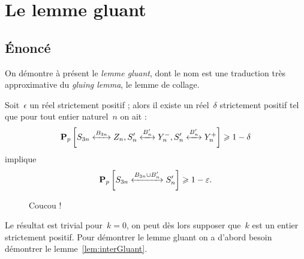 \section{Le lemme gluant}
	\subsection{Énoncé}
		On démontre à présent le \emph{lemme gluant}, dont le nom est une traduction très approximative du \emph{gluing lemma}, le lemme de collage.
			
		\begin{lem}\label{lem:gluant}
			Soit~$\epsilon$ un réel strictement positif ; alors il existe un réel~$\delta$ strictement positif tel que pour tout entier naturel~$n$ on ait :
			\[
				\Pp{\relie[B_{3n}]{S_{3n}}{Z_n},
					\relie[B_n']{S_n'}{Y_n^-},
					\relie[B_n']{S_n'}{Y_n^+}}
				\geq 1 - \delta
			\]
			implique
			\[
				\Pp{\relie[B_{3n}\cup B_n']{S_{3n}}{S_n'}}
				\geq 1 - \epsilon.
			\]
		\end{lem}
			\begin{figure}[h]
			\begin{center}
			\begin{quartCarre}
			\end{quartCarre}
			\end{center}
			\caption{Coucou !}
		\end{figure}
		Le résultat est trivial pour~$k=0$, on peut dès lors supposer que~$k$ est un entier strictement positif. Pour démontrer le lemme gluant on a d'abord besoin démontrer le lemme~\ref{lem:interGluant}.
	
